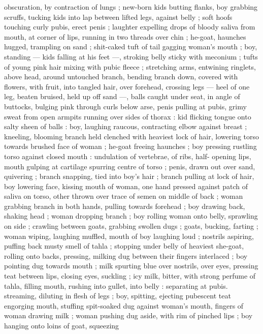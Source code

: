 {obscuration, by contraction of lungs ; new-born kids butting flanks, 
boy grabbing scruffs, tucking kids into lap between lifted legs, 
against belly ; soft hoofs touching curly pubis, erect penis ; laughter 
expelling drops of bloody saliva from mouth, at corner of lips, 
running in two threads over chin ; he-goat, haunches hugged, 
trampling on sand ; shit-caked tuft of tail gagging woman's mouth ; 
boy, standing --- kids falling at his feet ---, stroking belly sticky with 
meconium ; tufts of young pink hair mixing with pubic fleece ; 
stretching arms, entwining ringlets, above head, around untouched 
branch, bending branch down, covered with flowers, with fruit, into 
tangled hair, over forehead, crossing legs --- heel of one leg, beaten 
bruised, held up off sand ---, balls caught under seat, in angle of 
buttocks, bulging pink through curls below arse, penis pulling at 
pubis, grimy sweat from open armpits running over sides of thorax : 
kid flicking tongue onto salty sheen of balls : boy, laughing raucous, 
contracting elbow against breast ; kneeling, blooming branch held 
clenched with heaviest lock of hair, lowering torso towards brushed 
face of woman ; he-goat freeing haunches ; boy pressing rustling 
torso against closed mouth : undulation of vertebrae, of ribs, half- 
opening lips, mouth gulping at cartilage spurring centre of torso ; 
penis, drawn out over sand, quivering ; branch snapping, tied into 
boy's hair ; branch pulling at lock of hair, boy lowering face, kissing 
mouth of woman, one hand pressed against patch of saliva on torso, 
other thrown over trace of semen on middle of back ; woman 
grabbing branch in both hands, pulling towards forehead ; boy 
drawing back, shaking head ; woman dropping branch ; boy rolling 
woman onto belly, sprawling on side ; crawling between goats, 
grabbing swollen dugs ; goats, bucking, farting ; woman wiping, 
laughing muffled, mouth of boy laughing loud ; nostrils aspiring, 
puffing back musty smell of tahla ; stopping under belly of heaviest 
she-goat, rolling onto backs, pressing, milking dug between their 
fingers interlaced ; boy pointing dug towards mouth ; milk spurting 
blue over nostrils, over eyes, pressing teat between lips, closing 
eyes, suckling ; icy milk, bitter, with strong perfume of tahla, filling 
mouth, rushing into gullet, into belly : separating at pubis. 
streaming, diluting in flesh of legs ; boy, spitting, ejecting pubescent 
teat engorging mouth, stuffing spit-soaked dug against woman's 
mouth, fingers of woman drawing milk ; woman pushing dug aside, 
with rim of pinched lips ; boy hanging onto loins of goat, squeezing 
}
